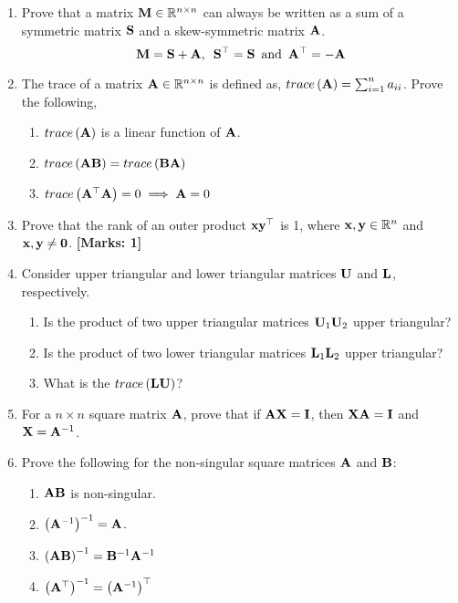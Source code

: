 \begin{enumerate}
    \item Prove that a matrix $\mathbf{M} \in \mathbb{R}^{n \times n}$ can always be written as a sum of a symmetric matrix $\mathbf{S}$ and a skew-symmetric matrix $\mathbf{A}$.
    \[ \mathbf{M} = \mathbf{S} + \mathbf{A}, \,\,\, \mathbf{S}^\top = \mathbf{S} \, \text{ and } \, \mathbf{A}^\top = -\mathbf{A} \]

    \item The trace of a matrix $\mathbf{A} \in \mathbb{R}^{n \times n}$ is defined as, $trace\left(\mathbf{A}\right) = \sum_{i=1}^{n}a_{ii}$. Prove the following,
    \begin{enumerate}
        \item $trace\left(\mathbf{A}\right)$ is a linear function of $\mathbf{A}$.
        \item $trace\left(\mathbf{AB}\right) = trace\left(\mathbf{BA}\right)$
        \item $trace\left(\mathbf{A}^\top\mathbf{A}\right) = 0 \implies \mathbf{A} = 0$
    \end{enumerate}

    \item Prove that the rank of an outer product $\mathbf{x}\mathbf{y}^\top$ is 1, where $\mathbf{x},\mathbf{y} \in \mathbb{R}^n$ and $\mathbf{x}, \mathbf{y} \neq \mathbf{0}$.  \textbf{[Marks: 1]}

    \item Consider upper triangular and lower triangular matrices $\mathbf{U}$ and $\mathbf{L}$, respectively.
    \begin{enumerate}
        \item Is the product of two upper triangular matrices $\mathbf{U}_1\mathbf{U}_2$ upper triangular?
        \item Is the product of two lower triangular matrices $\mathbf{L}_1\mathbf{L}_2$ upper triangular?
        \item What is the $trace\left( \mathbf{L}\mathbf{U} \right)$?
    \end{enumerate}

    \item For a $n \times n$ square matrix $\mathbf{A}$, prove that if $\mathbf{A}\mathbf{X} = \mathbf{I}$, then $\mathbf{X}\mathbf{A} = \mathbf{I}$ and $\mathbf{X} = \mathbf{A}^{-1}$.

    \item Prove the following for the non-singular square matrices $\mathbf{A}$ and $\mathbf{B}$:
    \begin{enumerate}
        \item $\mathbf{A}\mathbf{B}$ is non-singular.
        \item $\left( \mathbf{A}^{-1}\right)^{-1} = \mathbf{A}$.
        \item $\left( \mathbf{A}\mathbf{B}\right)^{-1} = \mathbf{B}^{-1}\mathbf{A}^{-1}$
        \item $\left( \mathbf{A}^\top\right)^{-1} = \left( \mathbf{A}^{-1}\right)^\top$
    \end{enumerate}


\end{enumerate}
